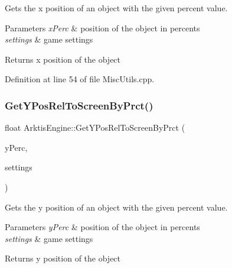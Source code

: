 Gets the x position of an object with the given percent value. 


\begin{DoxyParams}{Parameters}
{\em x\+Perc} & position of the object in percents\\
\hline
{\em settings} & game settings\\
\hline
\end{DoxyParams}
\begin{DoxyReturn}{Returns}
x position of the object \begin{DoxyVerb}\end{DoxyVerb}
 
\end{DoxyReturn}


Definition at line 54 of file Misc\+Utils.\+cpp.


\begin{DoxyCode}{0}

\end{DoxyCode}
\mbox{\label{namespace_arktis_engine_aa7101d84beded8cfc89a1b005f3b1f2a}} 
\subsubsection{\texorpdfstring{GetYPosRelToScreenByPrct()}{GetYPosRelToScreenByPrct()}}
{\footnotesize\ttfamily float Arktis\+Engine\+::\+Get\+Y\+Pos\+Rel\+To\+Screen\+By\+Prct (\begin{DoxyParamCaption}\item[{float}]{y\+Perc,  }\item[{\mbox{\hyperlink{struct_arktis_engine_1_1_game_settings}{Game\+Settings}} \&}]{settings }\end{DoxyParamCaption})}



Gets the y position of an object with the given percent value. 


\begin{DoxyParams}{Parameters}
{\em y\+Perc} & position of the object in percents\\
\hline
{\em settings} & game settings\\
\hline
\end{DoxyParams}
\begin{DoxyReturn}{Returns}
y position of the object \begin{DoxyVerb}\end{DoxyVerb}
 
\end{DoxyReturn}


